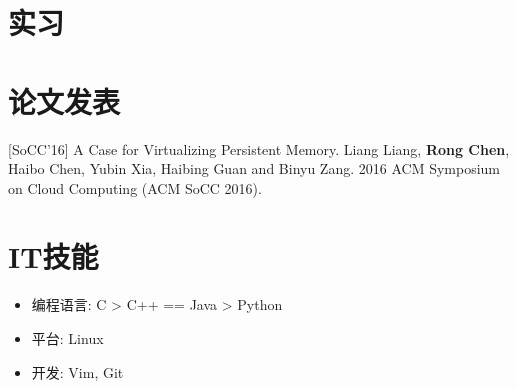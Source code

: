\documentclass{resume}
\begin{document}
\section{实习}

\section{论文发表}
[SoCC'16] A Case for Virtualizing Persistent Memory. Liang Liang, \textbf{Rong Chen}, Haibo Chen, Yubin Xia, Haibing Guan and Binyu Zang. 2016 ACM Symposium on Cloud Computing (ACM SoCC 2016).

\section{IT技能}
\begin{itemize}[parsep=0.5ex]
  \item 编程语言: C > C++ == Java > Python
  \item 平台: Linux
  \item 开发: Vim, Git
\end{itemize}

%
%
\end{document}
